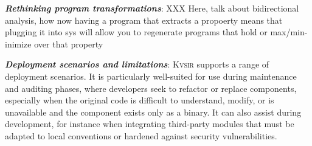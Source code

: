 \documentclass[sigplan,review,anonymous,10pt]{acmart}
\newcommand{\sys}{{\scshape Kv{\textalpha}sir}\xspace}
\newcommand{\heading}[1]{\vspace{2pt}\noindent\textbf{\emph{#1}}:\enspace}
\begin{document}
\heading{Rethinking program transformations}
XXX Here, talk about bidirectional analysis, how now having a program that extracts 
a propoerty means that plugging it into sys will allow you to regenerate programs that hold or max/min-inimize over that property

\heading{Deployment scenarios and limitations}
\sys supports a range of deployment scenarios.
It is particularly well-suited for use during maintenance and auditing phases, where developers seek to refactor or replace components, especially when the original code is difficult to understand, modify, or is unavailable and the component exists only as a binary.
It can also assist during development, for instance when integrating
third-party modules that must be adapted to local conventions or hardened
against security vulnerabilities.


\end{document}
